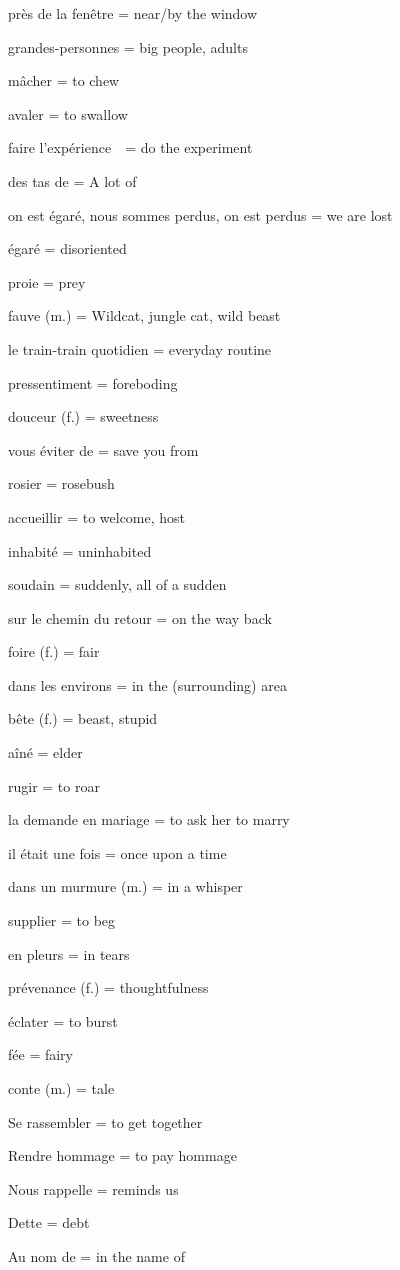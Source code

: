 près de la fenêtre = near/by the window

grandes-personnes = big people, adults

mâcher = to chew

avaler = to swallow

faire l'expérience~~= do the experiment

des tas de = A lot of

on est {égaré}, nous sommes perdus, on est perdus = we are lost

égaré = disoriented

proie = prey

fauve (m.) = Wildcat, jungle cat, wild beast

le train-train quotidien = everyday routine

pressentiment = foreboding

douceur (f.) = sweetness

vous éviter de = save you from

rosier = rosebush

accueillir = to welcome, host

inhabité = uninhabited

soudain = suddenly, all of a sudden

sur le chemin du retour = on the way back

foire (f.) = fair

dans les environs = in the (surrounding) area

bête (f.) = beast, stupid

aîné = elder

rugir = to roar

la demande en mariage = to ask her to marry

il était une fois = once upon a time

dans un murmure (m.) = in a whisper

supplier = to beg

en pleurs = in tears

prévenance (f.) = thoughtfulness

éclater = to burst

fée = fairy

conte (m.) = tale

Se rassembler = to get together~

Rendre hommage = to pay hommage~

Nous rappelle = reminds us~

Dette = debt

Au nom de = in the name of

